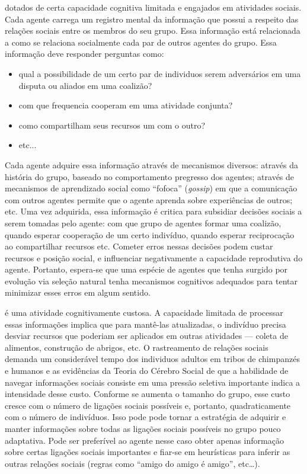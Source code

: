  dotados de certa capacidade cognitiva limitada e engajados em atividades sociais. Cada agente carrega um registro mental da informação que possui a respeito das relações sociais entre os membros do seu grupo. Essa informação está relacionada a como se relaciona socialmente cada par de outros agentes do grupo. Essa informação deve responder perguntas como: 
\begin{itemize}
 \item qual a possibilidade de um certo par de individuos serem adversários em uma disputa ou aliados em uma coalizão?
 \item com que frequencia cooperam em uma atividade conjunta?
 \item como compartilham seus recursos um com o outro?
 \item etc...
\end{itemize}  
Cada agente adquire essa informação através de mecanismos diversos: através da história do grupo, baseado no comportamento pregresso dos agentes; através de mecanismos de aprendizado social como ``fofoca'' (\textit{gossip}) em que a comunicação com outros agentes permite que o agente aprenda sobre experiências de outros; etc. Uma vez adquirida, essa informação é critica para subsidiar decisões sociais a serem tomadas pelo agente: com que grupo de agentes formar uma coalizão, quando esperar cooperação de um certo indivíduo, quando esperar reciprocação ao compartilhar recursos etc. Cometer erros nessas decisões podem custar recursos e posição social, e influenciar negativamente a capacidade reprodutiva do agente. Portanto, espera-se que uma espécie de agentes que tenha surgido por evolução via seleção natural tenha mecanismos cognitivos adequados para tentar minimizar esses erros em algum sentido. 

 é uma atividade cognitivamente custosa. A capacidade limitada de processar essas informações implica que para mantê-las atualizadas, o indivíduo precisa desviar recursos 
que poderiam ser aplicados em outras atividades --- coleta de alimentos, construção de abrigos, etc. O rastreamento de relações sociais demanda um considerável tempo dos individuos adultos em tribos de chimpanzés e humanos\cite[-5em]{deWaal2007} e as evidências da Teoria do Cérebro Social de que a habilidade de navegar informações sociais consiste em uma pressão seletiva importante indica a intensidade desse custo. Conforme se aumenta o tamanho do grupo, esse custo cresce com o número de ligações sociais possíveis e, portanto, quadraticamente com o número de indivíduos. Isso pode pode tornar a estratégia de adquirir e manter informações sobre todas as ligações sociais possíveis no grupo pouco adaptativa. Pode ser preferível ao agente nesse caso obter apenas informação sobre certas ligações sociais importantes e fiar-se em heurísticas para inferir as outras relações sociais (regras como ``amigo do amigo é amigo'', etc\ldots).

